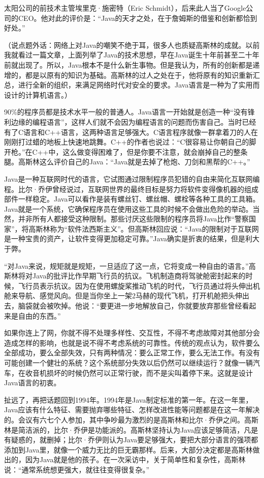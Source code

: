 \documentclass[
  letterpaper,
  DIV=11,
  numbers=noendperiod]{scrreprt}
\begin{document}
太阳公司的前技术主管埃里克·施密特（Eric
Schmidt），后来此人当了Google公司的CEO。他对此的评价是：``Java的天才之处，在于詹姆斯的借鉴和创新都恰到好处。''

（说点题外话：网络上对Java的嘲笑不绝于耳，很多人也质疑高斯林的成就。以前我就看过一篇文章，上面列举了Java的技术思想，早在Java诞生十年前甚至二十年前就出现了。所以，Java根本不是什么新生事物。但是我认为，所有的创新都是递增的，都是以原有的知识为基础。高斯林的过人之处在于，他将原有的知识重新汇总，进行全新的组织，来满足网络时代对安全的要求。Java语言是一种为了实用而设计的计算机语言。）

90\%的程序员都是技术水平一般的普通人。Java语言一开始就是创造一种``没有锋利边缘的编程语言''，这样人们就不会因为编程语言的问题而伤害自己。当时已经有了C语言和C++语言，这两种语言足够强大。C语言程序就像一群拿着刀的人在刚刚打过蜡的地板上快速地跳舞。C++的作者也说过：``C很容易让你朝自己的脚开枪。''在C++中，这么做变得困难了，但是你要不注意，就会崩掉自己的整条腿。高斯林这么评价自己的Java：``Java就是去掉了枪炮、刀剑和黑帮的C++。''

Java是一种互联网时代的语言，它试图通过限制程序员犯错的自由来简化互联网编程。比尔·乔伊曾经说过，互联网世界的最终目标是努力将软件变得像机器的组成部件一样稳定。Java可以看作是装有螺丝钉、螺丝帽、螺栓等各种工具的工具箱。Java就是一个系统，它确保程序员在使用这些工具的时候不会做出危险的举动。当然，并非所有人都接受这种限制。那些讨厌这些限制的程序员将Java比作``警察国家''，将高斯林称为``软件法西斯主义''。但高斯林回应说：``Java的限制对于互联网是一种宝贵的资产，让软件变得更加稳定可靠。''Java确实是折衷的结果，但是利大于弊。

``对Java来说，规矩就是规矩，一旦适应了这一点，它将变成一种自由的语言。''高斯林将对Java的批评比作早期飞行员的抗议。飞机制造商将驾驶舱密封起来的时候，飞行员表示抗议。因为在使用螺旋桨推动飞机的时代，飞行员通过将头伸出机舱来导航、感觉风向。但是当你坐上一架2马赫的现代飞机，打开机舱把头伸出去，脑袋就会被吹掉。他说：``要更进一步地解放自己，你就要放弃那些曾经看起来是自由的东西。''

如果你连上了网，你就不得不处理多样性、交互性，不得不考虑故障对其他部分会造成怎样的影响，也就是说不得不考虑系统的可靠性。传统的观点认为，软件要么全部成功，要么全部失效，只有两种情况：要么正常工作，要么无法工作。有没有可能创建一个健壮的系统？这个系统部分失效以后仍然可以继续运行？就像一辆汽车，在收音机损坏的时候仍然可以正常行驶，而不是尖叫着停下来。这就是设计Java语言的初衷。

扯远了，再把话题回到1994年。1994年是Java制定标准的第一年。在这一年里，Java应该有什么特征、需要抛弃哪些特征、怎样改进性能等问题都是在这一年解决的。会议有六七个人参加，其中争吵最为激烈的是高斯林和比尔·乔伊之间。高斯林是简洁派的，比尔·乔伊是功能派的。高斯林坚持认为Java应该足够简洁，凡是有疑惑的，就删掉；比尔·乔伊则认为Java要足够强大，要把大部分语言的强项都添加到Java里，就像一个威力无比的巨无霸那样。后来，大部分决定都是高斯林做出的，因为Java就是他的孩子。在一次采访中，关于简单性和复杂性，高斯林说：``通常系统想更强大，就往往变得很复杂。''
\end{document}
